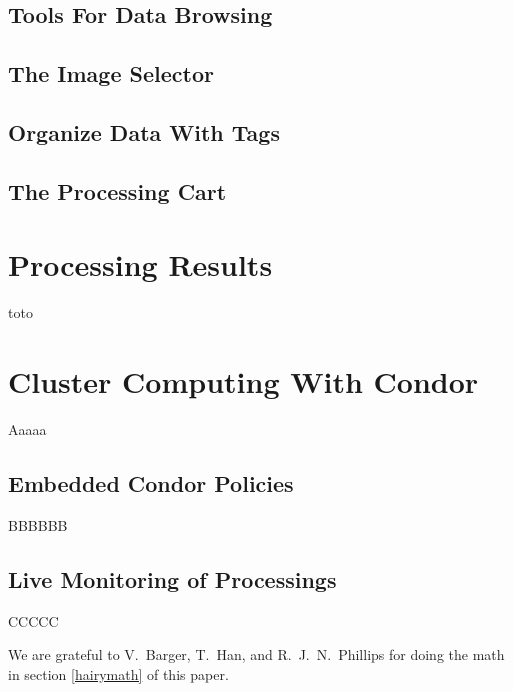 \documentclass[11pt,twoside]{article}  %
\begin{document}
\subsection{Tools For Data Browsing}
\subsection{The Image Selector}\label{sec:ims}
\subsection{Organize Data With Tags}
\subsection{The Processing Cart}

\section{Processing Results}
toto
\section{Cluster Computing With Condor}
Aaaaa
\subsection{Embedded Condor Policies}
BBBBBB
\subsection{Live Monitoring of Processings}
CCCCC

\acknowledgments

We are grateful to V.\ Barger, T.\ Han, and R.~J.~N.\ Phillips for doing
the math in section \ref{hairymath} of this paper.
\end{document}
